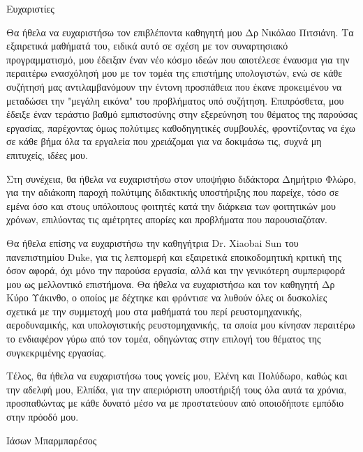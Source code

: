\vspace*{\fill}  
Ευχαριστίες

Θα ήθελα να ευχαριστήσω τον επιβλέποντα καθηγητή μου Δρ Νικόλαο Πιτσιάνη.
Τα εξαιρετικά μαθήματά του, ειδικά αυτό σε σχέση με τον συναρτησιακό προγραμματισμό, μου έδειξαν έναν νέο κόσμο ιδεών που αποτέλεσε έναυσμα για την περαιτέρω ενασχόλησή μου με τον τομέα της επιστήμης υπολογιστών, ενώ σε κάθε συζήτησή μας αντιλαμβανόμουν την έντονη προσπάθεια που έκανε προκειμένου να μεταδώσει την "μεγάλη εικόνα" του προβλήματος υπό συζήτηση.
Επιπρόσθετα, μου έδειξε έναν τεράστιο βαθμό εμπιστοσύνης στην εξερεύνηση του θέματος της παρούσας εργασίας, παρέχοντας όμως πολύτιμες καθοδηγητικές συμβουλές, φροντίζοντας να έχω σε κάθε βήμα όλα τα εργαλεία που χρειάζομαι για να δοκιμάσω τις, συχνά μη επιτυχείς, ιδέες μου.

Στη συνέχεια, θα ήθελα να ευχαριστήσω στον υποψήφιο διδάκτορα Δημήτριο Φλώρο, για την αδιάκοπη παροχή πολύτιμης διδακτικής υποστήριξης που παρείχε, τόσο σε εμένα όσο και στους υπόλοιπους φοιτητές κατά την διάρκεια των φοιτητικών μου χρόνων, επιλύοντας τις αμέτρητες απορίες και προβλήματα που παρουσιαζόταν.

Θα ήθελα επίσης να ευχαριστήσω την καθηγήτρια Dr. Xiaobai Sun του πανεπιστημίου Duke, για τις λεπτομερή και εξαιρετικά εποικοδομητική κριτική της όσον αφορά, όχι μόνο την παρούσα εργασία, αλλά και την γενικότερη συμπεριφορά μου ως μελλοντικό επιστήμονα.
Θα ήθελα να ευχαριστήσω και τον καθηγητή Δρ Κύρο Υάκινθο, ο οποίος με δέχτηκε και φρόντισε να λυθούν όλες οι δυσκολίες σχετικά με την συμμετοχή μου στα μαθήματά του περί ρευστομηχανικής, αεροδυναμικής, και υπολογιστικής ρευστομηχανικής, τα οποία μου κίνησαν περαιτέρω το ενδιαφέρον γύρω από τον τομέα, οδηγώντας στην επιλογή του θέματος της συγκεκριμένης εργασίας.

Τέλος, θα ήθελα να ευχαριστήσω τους γονείς μου, Ελένη και Πολύδωρο, καθώς και την αδελφή μου, Ελπίδα, για την απεριόριστη υποστήριξή τους όλα αυτά τα χρόνια, προσπαθώντας με κάθε δυνατό μέσο να με προστατεύουν από οποιοδήποτε εμπόδιο στην πρόοδό μου.

\begin{flushright}
Ιάσων Μπαρμπαρέσος
\end{flushright}
\vspace*{\fill}

\newpage

